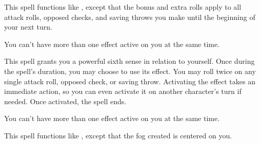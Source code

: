 \begin{spelleffect}
  This spell functions like , except that the bonus and extra rolls apply to all attack rolls, opposed checks, and saving throws you make until the beginning of your next turn.
\end{spelleffect}
\begin{spellnotes}
  You can't have more than one  effect active on you at the same time.
\end{spellnotes}

\begin{spelleffect}
  This spell grants you a powerful sixth sense in relation to yourself. Once during the spell's duration, you may choose to use its effect. You may roll twice on any single attack roll, opposed check, or saving throw. Activating the effect takes an immediate action, so you can even activate it on another character's turn if needed. Once activated, the spell ends.
\end{spelleffect}
\begin{spellnotes}
  You can't have more than one  effect active on you at the same time.
\end{spellnotes}

\begin{comment}
\subsubsection{O-P}
\end{comment}

\begin{spelleffect}
  This spell functions like , except that the fog created is centered on you.
\end{spelleffect}

